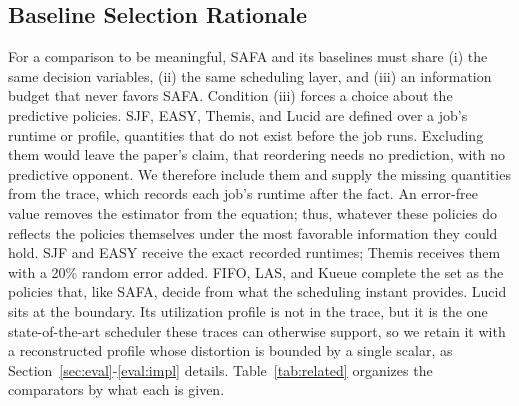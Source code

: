 \documentclass{ieeetj}
\begin{document}
\subsection{Baseline Selection Rationale}\label{baseline-rationale}
For a comparison to be meaningful, SAFA and its baselines must share (i) the same decision variables, (ii) the same scheduling layer, and (iii) an information budget that never favors SAFA. Condition (iii) forces a choice about the predictive policies. SJF, EASY, Themis, and Lucid are defined over a job's runtime or profile, quantities that do not exist before the job runs. Excluding them would leave the paper's claim, that reordering needs no prediction, with no predictive opponent. We therefore include them and supply the missing quantities from the trace, which records each job's runtime after the fact. An error-free value removes the estimator from the equation; thus, whatever these policies do reflects the policies themselves under the most favorable information they could hold. SJF and EASY receive the exact recorded runtimes; Themis receives them with a 20\% random error added. FIFO, LAS, and Kueue complete the set as the policies that, like SAFA, decide from what the scheduling instant provides. Lucid sits at the boundary. Its utilization profile is not in the trace, but it is the one state-of-the-art scheduler these traces can otherwise support, so we retain it with a reconstructed profile whose distortion is bounded by a single scalar, as Section~\ref{sec:eval}-\ref{eval:impl} details. Table~\ref{tab:related} organizes the comparators by what each is given.
\end{document}
